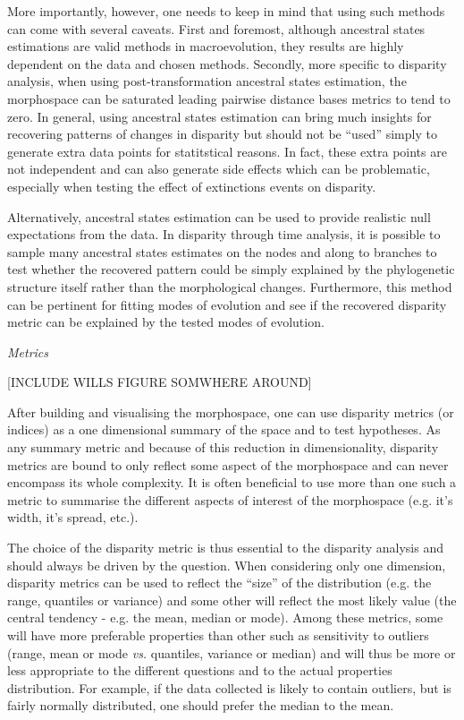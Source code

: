 \documentclass[12pt,letterpaper]{article}
\renewcommand{\subsection}[1]{%
\bigskip
\begin{center}
\begin{large}
\normalfont\itshape #1
\end{large}
\end{center}}
\begin{document}
More importantly, however, one needs to keep in mind that using such methods can come with several caveats.
First and foremost, although ancestral states estimations are valid methods in macroevolution, they results are highly dependent on the data and chosen methods.
Secondly, more specific to disparity analysis, when using post-transformation ancestral states estimation, the morphospace can be saturated leading pairwise distance bases metrics to tend to zero.
In general, using ancestral states estimation can bring much insights for recovering patterns of changes in disparity but should not be ``used'' simply to generate extra data points for statitstical reasons.
In fact, these extra points are not independent and can also generate side effects which can be problematic, especially when testing the effect of extinctions events on disparity.

Alternatively, ancestral states estimation can be used to provide realistic null expectations from the data.
In disparity through time analysis, it is possible to sample many ancestral states estimates on the nodes and along to branches to test whether the recovered pattern could be simply explained by the phylogenetic structure itself rather than the morphological changes.
Furthermore, this method can be pertinent for fitting modes of evolution and see if the recovered disparity metric can be explained by the tested modes of evolution.

\subsection{Metrics}
\label{metrics}
 
[INCLUDE WILLS FIGURE SOMWHERE AROUND]


After building and visualising the morphospace, one can use disparity metrics (or indices) as a one dimensional summary of the space and to test hypotheses.
As any summary metric and because of this reduction in dimensionality, disparity metrics are bound to only reflect some aspect of the morphospace and can never encompass its whole complexity.
It is often beneficial to use more than one such a metric to summarise the different aspects of interest of the morphospace (e.g. it's width, it's spread, etc.).

The choice of the disparity metric is thus essential to the disparity analysis and should always be driven by the question.
When considering only one dimension, disparity metrics can be used to reflect the ``size'' of the distribution (e.g. the range, quantiles or variance) and some other will reflect the most likely value (the central tendency - e.g. the mean, median or mode).
Among these metrics, some will have more preferable properties than other such as sensitivity to outliers (range, mean or mode \textit{vs.} quantiles, variance or median) and will thus be more or less appropriate to the different questions and to the actual properties distribution.
For example, if the data collected is likely to contain outliers, but is fairly normally distributed, one should prefer the median to the mean.
\end{document}
